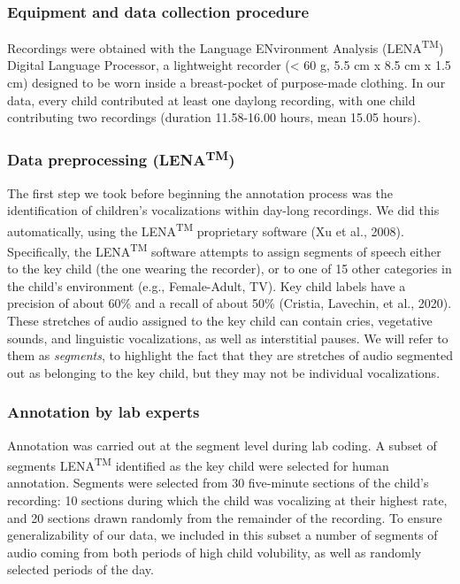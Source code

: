 \documentclass[english,,man]{apa6}
\begin{document}
\hypertarget{equipment-and-data-collection-procedure}{%
\subsubsection{Equipment and data collection procedure}\label{equipment-and-data-collection-procedure}}

Recordings were obtained with the Language ENvironment Analysis (LENA\textsuperscript{TM}) Digital Language Processor, a lightweight recorder (\textless{} 60 g, 5.5 cm x 8.5 cm x 1.5 cm) designed to be worn inside a breast-pocket of purpose-made clothing. In our data, every child contributed at least one daylong recording, with one child contributing two recordings (duration 11.58-16.00 hours, mean 15.05 hours).

\hypertarget{data-preprocessing-lenatm}{%
\subsubsection{\texorpdfstring{Data preprocessing (LENA\textsuperscript{TM})}{Data preprocessing (LENATM)}}\label{data-preprocessing-lenatm}}

The first step we took before beginning the annotation process was the identification of children's vocalizations within day-long recordings. We did this automatically, using the LENA\textsuperscript{TM} proprietary software (Xu et al., 2008). Specifically, the LENA\textsuperscript{TM} software attempts to assign segments of speech either to the key child (the one wearing the recorder), or to one of 15 other categories in the child's environment (e.g., Female-Adult, TV). Key child labels have a precision of about 60\% and a recall of about 50\% (Cristia, Lavechin, et al., 2020). These stretches of audio assigned to the key child can contain cries, vegetative sounds, and linguistic vocalizations, as well as interstitial pauses. We will refer to them as \emph{segments}, to highlight the fact that they are stretches of audio segmented out as belonging to the key child, but they may not be individual vocalizations.

\hypertarget{annotation-by-lab-experts}{%
\subsubsection{Annotation by lab experts}\label{annotation-by-lab-experts}}

Annotation was carried out at the segment level during lab coding. A subset of segments LENA\textsuperscript{TM} identified as the key child were selected for human annotation. Segments were selected from 30 five-minute sections of the child's recording: 10 sections during which the child was vocalizing at their highest rate, and 20 sections drawn randomly from the remainder of the recording. To ensure generalizability of our data, we included in this subset a number of segments of audio coming from both periods of high child volubility, as well as randomly selected periods of the day.
\end{document}
